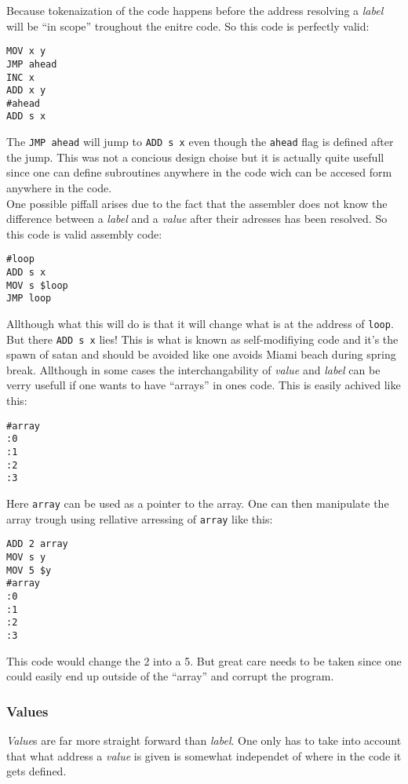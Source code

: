 \documentclass{article}
\newcommand{\V}{\verb}
\begin{document}
Because tokenaization of the code happens before the address resolving a \emph{label}
will be ``in scope'' troughout the enitre code. So this code is perfectly valid:

\begin{verbatim}
MOV x y
JMP ahead
INC x
ADD x y
#ahead
ADD s x
\end{verbatim}
The \V+JMP ahead+ will jump to \V+ADD s x+ even though the \V+ahead+ flag is
defined after the jump. This was not a concious design choise but it is actually
quite usefull since one can define subroutines anywhere in the code wich can be
accesed form anywhere in the code.\\
One possible piffall arises due to the fact that the assembler does not know the
difference between a \emph{label} and a \emph{value} after their adresses has been resolved.
So this code is valid assembly code:
\begin{verbatim}
#loop
ADD s x
MOV s $loop
JMP loop
\end{verbatim}
Allthough what this will do is that it will change what is at the address of
\V+loop+. But there \V+ADD s x+ lies! This is what is known as self-modifiying
code and it's the spawn of satan and should be avoided like one avoids Miami
beach during spring break. Allthough in some cases the interchangability of
\emph{value} and \emph{label} can be verry usefull if one wants to have ``arrays'' in ones
code. This is easily achived like this:
\begin{verbatim}
#array
:0
:1
:2
:3
\end{verbatim}
Here \V+array+ can be used as a pointer to the array. One can then manipulate
the array trough using rellative arressing of \V+array+ like this:
\begin{verbatim}
ADD 2 array
MOV s y
MOV 5 $y
#array
:0
:1
:2
:3
\end{verbatim}
This code would change the 2 into a 5. But great care needs to be taken since
one could easily end up outside of the ``array'' and corrupt the program.

\subsubsection{Values}
\emph{Value}s are far more straight forward than \emph{label}. One only has to
take into account that what address a \emph{value} is given is somewhat
independet of where in the code it gets defined.
\end{document}
